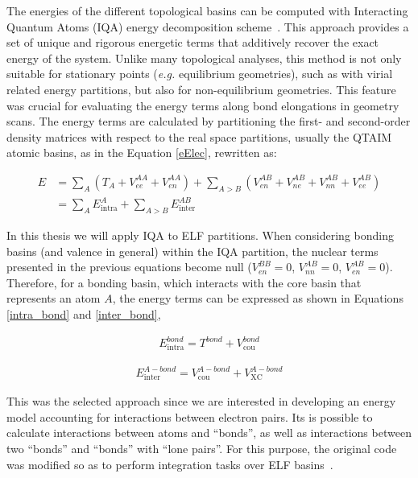 The energies of the different topological basins can be computed with
Interacting Quantum Atoms (IQA) energy decomposition scheme~\cite{Blanco2005}.
This approach provides a set of unique and rigorous energetic terms that
additively recover the exact energy of the system. Unlike many topological
analyses, this method is not only suitable for stationary points (\textit{e.g.}
equilibrium geometries), such as with virial related energy partitions, but
also for non-equilibrium geometries. This feature was crucial for evaluating
the energy terms along bond elongations in geometry scans. The energy terms are
calculated by partitioning the first- and second-order density matrices with
respect to the real space partitions, usually the QTAIM atomic basins, as in
the Equation \ref{eElec}, rewritten as:

\begin{align}
  E &=\sum_A (T_A + V^{AA}_{ee} + V_{en}^{AA}) + \sum_{A > B} (V_{en}^{AB} + V_{ne}^{AB} + V_{nn}^{AB} + V_{ee}^{AB}) \\\nonumber
    &=\sum_A E^A_{\mathrm{intra}} + \sum_{A>B} E_{\mathrm{inter}}^{AB}
\end{align}

In this thesis we will apply IQA to ELF partitions.  When considering bonding
basins (and valence in general) within the IQA partition, the nuclear terms
presented in the previous equations become null ($V_{en}^{BB}=0$,
$V_{nn}^{AB}=0$, $V_{en}^{AB}=0$). Therefore, for a bonding basin, which
interacts with the core basin that represents an atom $A$, the energy terms can
be expressed as shown in Equations \ref{intra_bond} and \ref{inter_bond},

\begin{align}
  E_{\mathrm{intra}}^{bond} = T^{bond} + V_{\mathrm{cou}}^{bond}
\label{intra_bond}
\end{align}

\begin{align}
  E_{\mathrm{inter}}^{A-bond} = V_{\mathrm{cou}}^{A-bond} + V_{\mathrm{XC}}^{A-bond}
\label{inter_bond}
\end{align}

This was the selected approach since we are interested in developing an energy
model accounting for interactions between electron pairs.  Its is possible to
calculate interactions between atoms and ``bonds'', as well as interactions
between two ``bonds'' and ``bonds'' with ``lone pairs''. For this purpose, the
original code was modified so as to perform integration tasks over ELF
basins~\cite{MartnPends2008}.

